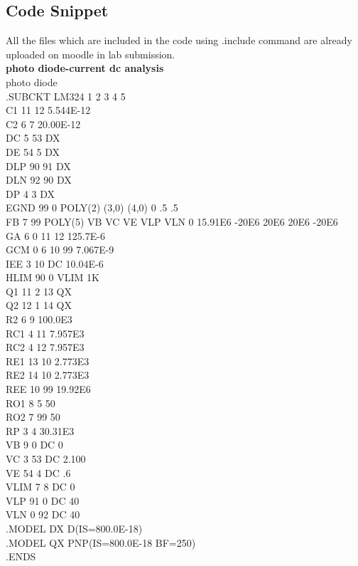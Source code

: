 \documentclass[12pt]{article}
\begin{document}
\subsection{Code Snippet}
All the files which are included in the code using .include command are already uploaded on moodle in lab submission.\\
\textbf{photo diode-current dc analysis\\}
photo diode\\
.SUBCKT LM324    1 2 3 4 5\\
C1   11 12 5.544E-12\\
C2    6  7 20.00E-12\\
DC    5 53 DX\\
DE   54  5 DX\\
DLP  90 91 DX\\
DLN  92 90 DX\\
DP    4  3 DX\\
EGND 99  0 POLY(2) (3,0) (4,0) 0 .5 .5\\
FB    7 99 POLY(5) VB VC VE VLP VLN 0 15.91E6 -20E6 20E6 20E6 -20E6\\
GA    6  0 11 12 125.7E-6\\
GCM   0  6 10 99 7.067E-9\\
IEE   3 10 DC 10.04E-6\\
HLIM 90  0 VLIM 1K\\
Q1   11  2 13 QX\\
Q2   12  1 14 QX\\
R2    6  9 100.0E3\\
RC1   4 11 7.957E3\\
RC2   4 12 7.957E3\\
RE1  13 10 2.773E3\\
RE2  14 10 2.773E3\\
REE  10 99 19.92E6\\
RO1   8  5 50\\
RO2   7 99 50\\
RP    3  4 30.31E3\\
VB    9  0 DC 0\\
VC 3 53 DC 2.100\\
VE   54  4 DC .6\\
VLIM  7  8 DC 0\\
VLP  91  0 DC 40\\
VLN   0 92 DC 40\\
.MODEL DX D(IS=800.0E-18)\\
.MODEL QX PNP(IS=800.0E-18 BF=250)\\
.ENDS\\
\end{document}
